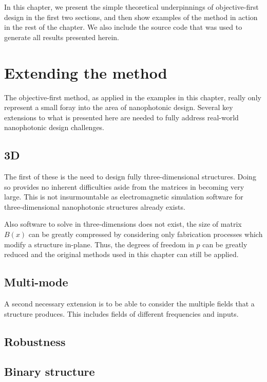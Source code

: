 In this chapter, we present the simple theoretical underpinnings of 
    objective-first design in the first two sections,
    and then show examples of the method in action in the rest of the chapter.
We also include the source code that was used to generate
    all results presented herein. %
    







\section{Extending the method}
The objective-first method, as applied in the examples in this chapter,
    really only represent a small foray into the area of nanophotonic design.
Several key extensions to what is presented here are needed to
    fully address real-world nanophotonic design challenges.

\subsection{3D}
The first of these is the need to design fully three-dimensional structures.
Doing so provides no inherent difficulties aside from the matrices in
     becoming very large.
This is not insurmountable as electromagnetic simulation software for 
    three-dimensional nanophotonic structures already exists.

Also software to solve  in three-dimensions does not exist,
    the size of matrix $B(x)$ can be greatly compressed by considering
    only fabrication processes which modify a structure in-plane.
Thus, the degrees of freedom in $p$ can be greatly reduced and the original
    methods used in this chapter can still be applied.
    
\subsection{Multi-mode}
A second necessary extension is to be able to consider the multiple fields
    that a structure produces.
This includes fields of different frequencies and inputs.

\subsection{Robustness}
\subsection{Binary structure}

